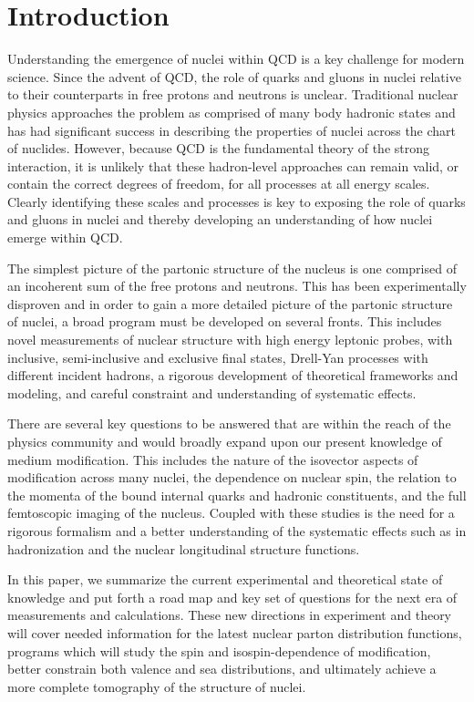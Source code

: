 \section{Introduction}


Understanding the emergence of nuclei within QCD is a key challenge for modern science.  Since the advent of QCD, the role of quarks and gluons in nuclei relative to their counterparts in free protons and neutrons is unclear.  Traditional nuclear physics approaches the problem as comprised of many body hadronic states and has had significant success in describing the properties of nuclei across the chart of nuclides. However, because QCD is the fundamental theory of the strong interaction, it is unlikely that these hadron-level approaches can remain valid, or contain the correct degrees of freedom, for all processes at all energy scales. Clearly identifying these scales and processes is key to exposing the role of quarks and gluons in nuclei and thereby developing an understanding of how nuclei emerge within QCD.

The simplest picture of the partonic structure of the nucleus is one comprised of an incoherent sum of the free protons and neutrons.  This has been experimentally disproven and in order to gain a more detailed picture of the partonic structure of nuclei, a broad program must be developed on several fronts.  This includes novel measurements of nuclear structure with high energy leptonic probes, with inclusive, semi-inclusive and exclusive final states, Drell-Yan processes with different incident hadrons, a rigorous development of theoretical frameworks and modeling, and  careful constraint and understanding of systematic effects.

There are several key questions to be answered that are within the reach of the physics community and would broadly expand upon our present knowledge of medium modification.  This includes the nature of the isovector aspects of modification across many nuclei, the dependence on nuclear spin, the relation to the momenta of the bound internal quarks and hadronic constituents, and the full femtoscopic imaging of the nucleus.  Coupled with these studies is the need for a rigorous formalism and a better understanding of the systematic effects such as in hadronization and the nuclear longitudinal structure functions. 

In this paper, we summarize the current experimental and theoretical state of knowledge and put forth a road map and key set of questions for the next era of measurements and calculations.  These new directions in experiment and theory will cover needed information for the latest nuclear parton distribution functions, programs which will study the spin and isospin-dependence of modification, better constrain both valence and sea distributions, and ultimately achieve a more complete tomography of the structure of nuclei.

